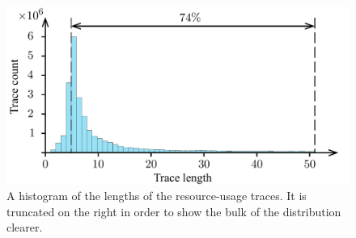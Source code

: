\begin{figure}[t]
  \centering
  \includegraphics[width=1.0\columnwidth]{include/assets/figures/traces.pdf}
  \vspace{-1.5em}
  \caption{
    A histogram of the lengths of the resource-usage traces. It is truncated on
    the right in order to show the bulk of the distribution clearer.
  }
  \vspace{-1.5em}
\end{figure}
